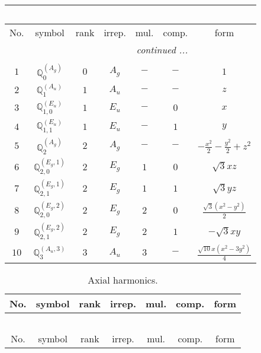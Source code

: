 \documentclass[fleqn,10pt,landscape]{article}
\begin{document}
\begin{itemize}
\begin{center}
\begin{longtable}{ccccccc}
\multicolumn{6}{l}{\tablename\ \thetable{}} \\
 \hline \hline
No. & symbol & rank & irrep. & mul. & comp. & form \\ \hline \endhead

 \hline \hline
\multicolumn{6}{r}{\footnotesize\it continued ...} \\ \endfoot

 \hline \hline
\multicolumn{6}{r}{} \\ \endlastfoot

$ 1 $ & $ \mathbb{Q}_{0}^{(A_{g})} $ & $ 0 $ & $ A_{g} $ & $ - $ & $ - $ & $ 1 $ \\ \hline
$ 2 $ & $ \mathbb{Q}_{1}^{(A_{u})} $ & $ 1 $ & $ A_{u} $ & $ - $ & $ - $ & $ z $ \\
$ 3 $ & $ \mathbb{Q}_{1,0}^{(E_{u})} $ & $ 1 $ & $ E_{u} $ & $ - $ & $ 0 $ & $ x $ \\
$ 4 $ & $ \mathbb{Q}_{1,1}^{(E_{u})} $ & $ 1 $ & $ E_{u} $ & $ - $ & $ 1 $ & $ y $ \\ \hline
$ 5 $ & $ \mathbb{Q}_{2}^{(A_{g})} $ & $ 2 $ & $ A_{g} $ & $ - $ & $ - $ & $ - \frac{x^{2}}{2} - \frac{y^{2}}{2} + z^{2} $ \\
$ 6 $ & $ \mathbb{Q}_{2,0}^{(E_{g},1)} $ & $ 2 $ & $ E_{g} $ & $ 1 $ & $ 0 $ & $ \sqrt{3} x z $ \\
$ 7 $ & $ \mathbb{Q}_{2,1}^{(E_{g},1)} $ & $ 2 $ & $ E_{g} $ & $ 1 $ & $ 1 $ & $ \sqrt{3} y z $ \\
$ 8 $ & $ \mathbb{Q}_{2,0}^{(E_{g},2)} $ & $ 2 $ & $ E_{g} $ & $ 2 $ & $ 0 $ & $ \frac{\sqrt{3} \left(x^{2} - y^{2}\right)}{2} $ \\
$ 9 $ & $ \mathbb{Q}_{2,1}^{(E_{g},2)} $ & $ 2 $ & $ E_{g} $ & $ 2 $ & $ 1 $ & $ - \sqrt{3} x y $ \\ \hline
$ 10 $ & $ \mathbb{Q}_{3}^{(A_{u},3)} $ & $ 3 $ & $ A_{u} $ & $ 3 $ & $ - $ & $ \frac{\sqrt{10} x \left(x^{2} - 3 y^{2}\right)}{4} $ \\
\end{longtable}
\end{center}
\begin{center}
\renewcommand{\arraystretch}{1.3}
\begin{longtable}{ccccccc}
\caption{Axial harmonics.}
 \\
 \hline \hline
No. & symbol & rank & irrep. & mul. & comp. & form \\ \hline \endfirsthead

\multicolumn{6}{l}{\tablename\ \thetable{}} \\
 \hline \hline
No. & symbol & rank & irrep. & mul. & comp. & form \\ \hline \endhead


\end{longtable}
\end{center}
\end{itemize}
\end{document}
